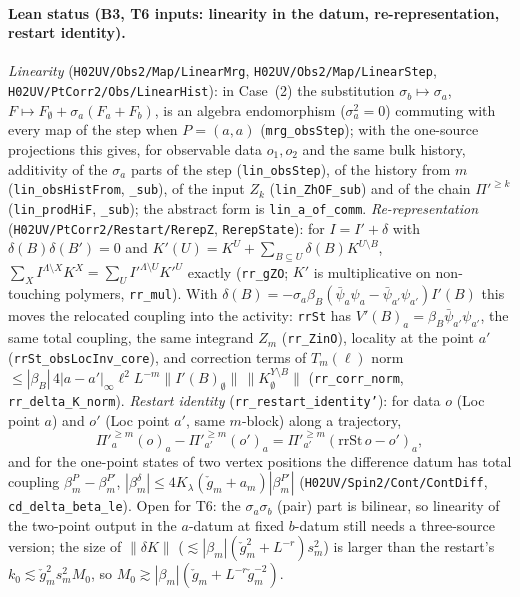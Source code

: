 \documentclass[11pt]{amsart}
\theoremstyle{definition}
\theoremstyle{remark}
\numberwithin{equation}{section}
\begin{document}
\paragraph{Lean status (B3, T6 inputs: linearity in the datum, re-representation, restart identity).}
\emph{Linearity} (\texttt{H02UV/Obs2/Map/LinearMrg}, \texttt{H02UV/Obs2/Map/LinearStep}, \texttt{H02UV/PtCorr2/Obs/LinearHist}): in Case~(2) the
substitution $\sigma_b\mapsto\sigma_a$, $F\mapsto F_\emptyset+\sigma_a(F_a+F_b)$, is an algebra endomorphism
($\sigma_a^2=0$) commuting with every map of the step when $P=(a,a)$ (\texttt{mrg\_obsStep}); with the one-source
projections this gives, for observable data $o_1,o_2$ and the same bulk history, additivity of the
$\sigma_a$ parts of the step (\texttt{lin\_obsStep}), of the history from $m$ (\texttt{lin\_obsHistFrom},
\texttt{\_sub}), of the input $Z_k$ (\texttt{lin\_ZhOF\_sub}) and of the chain $\Pi'^{\ge k}$ (\texttt{lin\_prodHiF},
\texttt{\_sub}); the abstract form is \texttt{lin\_a\_of\_comm}.
\emph{Re-representation} (\texttt{H02UV/PtCorr2/Restart/RerepZ}, \texttt{RerepState}): for $I=I'+\delta$ with
$\delta(B)\delta(B')=0$ and $K'(U)=K^U+\sum_{B\subseteq U}\delta(B)K^{U\setminus B}$,
$\sum_XI^{\Lambda\setminus X}K^X=\sum_UI'^{\Lambda\setminus U}K'^U$ exactly (\texttt{rr\_gZO}; $K'$ is multiplicative
on non-touching polymers, \texttt{rr\_mul}). With $\delta(B)=-\sigma_a\beta_B(\bar\psi_a\psi_a-\bar\psi_{a'}\psi_{a'})I'(B)$
this moves the relocated coupling into the activity: \texttt{rrSt} has $V'(B)_a=\beta_B\bar\psi_{a'}\psi_{a'}$,
the same total coupling, the same integrand $Z_m$ (\texttt{rr\_ZinO}), locality at the point $a'$
(\texttt{rrSt\_obsLocInv\_core}), and correction terms of $T_m(\ell)$ norm
$\le|\beta_B|\,4|a-a'|_\infty\ell^2L^{-m}\|I'(B)_\emptyset\|\,\|K^{Y\setminus B}_\emptyset\|$ (\texttt{rr\_corr\_norm},
\texttt{rr\_delta\_K\_norm}).
\emph{Restart identity} (\texttt{rr\_restart\_identity'}): for data $o$ (Loc point $a$) and $o'$ (Loc point $a'$,
same $m$-block) along a trajectory,
\[
  \Pi'^{\ge m}_{a}(o)_a-\Pi'^{\ge m}_{a'}(o')_a=\Pi'^{\ge m}_{a'}(\mathrm{rrSt}\,o-o')_a ,
\]
and for the one-point states of two vertex positions the difference datum has total coupling
$\beta^P_m-\beta^{P'}_m$, $|\beta^\delta_m|\le4K_\lambda(\check g_m+a_m)|\beta^{P'}_m|$ (\texttt{H02UV/Spin2/Cont/ContDiff},
\texttt{cd\_delta\_beta\_le}). Open for T6: the $\sigma_a\sigma_b$ (pair) part is bilinear, so linearity of the
two-point output in the $a$-datum at fixed $b$-datum still needs a three-source version; the size of
$\|\delta K\|$ ($\lesssim|\beta_m|(\check g_m^2+L^{-r})s_m^2$) is larger than the restart's
$k_0\lesssim\check g_m^2s_m^2M_0$, so $M_0\gtrsim|\beta_m|(\check g_m+L^{-r}\check g_m^{-2})$.
\end{document}
